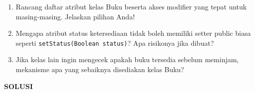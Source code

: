 \documentclass[11pt]{article}
\begin{document}
\begin{enumerate}
        \begin{enumerate}[label=\alph*)]
          \item Rancang daftar atribut kelas Buku beserta akses modifier yang tepat untuk masing-masing. Jelaskan pilihan Anda!
          \item Mengapa atribut status ketersediaan tidak boleh memiliki setter public biasa seperti \texttt{setStatus(Boolean status)}? Apa risikonya jika dibuat?
          \item Jika kelas lain ingin mengecek apakah buku tersedia sebelum meminjam, mekanisme apa yang sebaiknya disediakan kelas Buku?
        \end{enumerate}
\end{enumerate}

\newpage
\begin{center}
  \textbf{SOLUSI}
\end{center}
\end{document}
